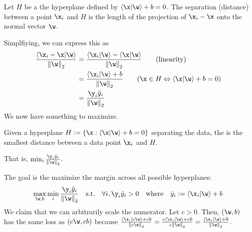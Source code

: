 \documentclass[class=cs480,notes,tikz]{agony}
\begin{document}
Let $H$ be a the hyperplane defined by $\ip{\x}{\w} + b = 0$.
The separation (distance) between a point $\x_i$ and $H$
is the length of the projection of \textcolor{blue}{$\x_i-\x$}
onto the normal vector \textcolor{orange}{$\w$}.
\begin{center}
\end{center}
Simplfiying, we can express this as
\begin{align*}
  \frac{\ip{\x_i-\x}{\w}}{\norm{\w}_2}
   & = \frac{\ip{\x_i}{\w} - \ip{\x}{\w}}{\norm{\w}_2} \tag{linearity}                \\
   & = \frac{\ip{\x_i}{\w} + b}{\norm{\w}_2} \tag{$\x \in H \Harr \ip{\x}{\w}+b = 0$} \\
   & = \frac{\y_i\hat y_i}{\norm{\w}_2}
\end{align*}
We now have something to maximize.
\begin{defn}[margin]
  Given a hyperplane $H := \{\x : \ip{\x}{\w} + b = 0\}$ separating the data,
  the  is the smallest distance between a data point $\x_i$ and $H$.

  That is, $\min_i \frac{\y_i \hat y_i}{\norm{\w}_2}$.
\end{defn}
The goal is the maximize the margin across all possible hyperplanes:
\[ \max_{\w,b} \min_i \frac{\y_i \hat y_i}{\norm{\w}_2} \qq{s.t.} \forall i, \y_i \hat y_i > 0 \qq{where} \hat y_i := \ip{\x_i}{\w} + b \]
We claim that we can arbitrarily scale the numerator.
Let $c>0$.
Then, $(\w,b)$ has the same loss as $(c\w,cb)$ because
$\frac{\ip{\x_i}{c\w}+cb}{\norm{c\w}_2}
  = \frac{c\ip{\x_i}{\w}+cb}{c\norm{\w}_2}
  = \frac{\ip{\x_i}{\w}+b}{\norm{\w}_2}$.
\end{document}
